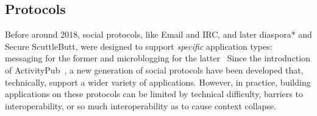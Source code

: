 





\subsection{Protocols}

Before around 2018, social protocols, like Email and IRC,
and later diaspora* and Secure ScuttleButt,
were designed to support \emph{specific} application types:
messaging for the former and microblogging for the latter~\cite{diaspora,scuttlebutt}
Since the introduction of ActivityPub~\cite{activitypub},
a new generation of social protocols have
been developed that, technically, support a wider variety of applications.
However, in practice,
building applications on these protocols can be limited by technical
difficulty, barriers to interoperability, or so much interoperability
as to cause context collapse.

